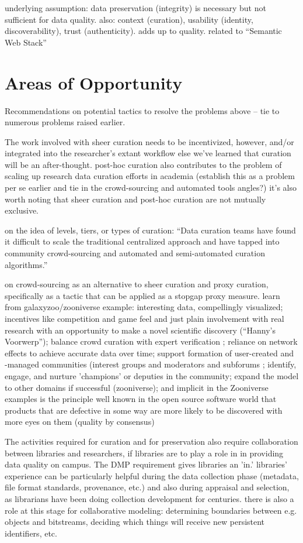 \documentclass{acm_proc_article-sp}
\begin{document}
underlying assumption: data preservation (integrity) is necessary but not
sufficient for data quality. also: context (curation), usability (identity,
discoverability), trust (authenticity). adds up to quality. related to
``Semantic Web Stack'' \cite{wiki:semweb}

\section{Areas of Opportunity}
Recommendations on potential tactics to resolve the problems above --
tie to numerous problems raised earlier.

The work involved with sheer curation needs to be incentivized,
however, and/or integrated into the researcher's extant workflow else
we've learned that curation will be an after-thought. post-hoc
curation also contributes to the problem of scaling
up\cite{curry:community} research data curation efforts in academia
(establish this as a problem per se earlier and tie in the
crowd-sourcing and automated tools angles?) it's also worth noting
that sheer curation and post-hoc curation are not mutually exclusive.

on the idea of levels, tiers, or types of curation: ``Data curation
teams have found it difficult to scale the traditional centralized
approach and have tapped into community crowd-sourcing and automated
and semi-automated curation algorithms.''\cite{curry:community}

on crowd-sourcing as an alternative to sheer curation and proxy
curation, specifically as a tactic that can be applied as a stopgap
proxy measure. learn from galaxyzoo/zooniverse example: interesting
data, compellingly visualized; incentives like competition and game
feel and just plain involvement with real research with an opportunity
to make a novel scientific discovery (``Hanny's Voorwerp''); balance
crowd curation with expert verification \cite{adams:galaxyzoo};
reliance on network effects to achieve accurate data over time;
support formation of user-created and -managed communities (interest
groups and moderators and subforums \cite{adams:galaxyzoo}; identify,
engage, and nurture 'champions' or deputies in the community; expand
the model to other domains if successful (zooniverse); and implicit in
the Zooniverse examples is the principle well known in the open source
software world that products that are defective in some way are more
likely to be discovered with more eyes on them (quality by consensus)

The activities required for curation and for preservation also require
collaboration between libraries and researchers, if libraries are to
play a role in in providing data quality on campus. The DMP
requirement gives libraries an 'in.' libraries' experience can be
particularly helpful during the data collection phase (metadata, file
format standards, provenance, etc.) and also during appraisal and
selection, as librarians have been doing collection development for
centuries. there is also a role at this stage for collaborative
modeling: determining boundaries between e.g. objects and bitstreams,
deciding which things will receive new persistent identifiers, etc.
\end{document}
